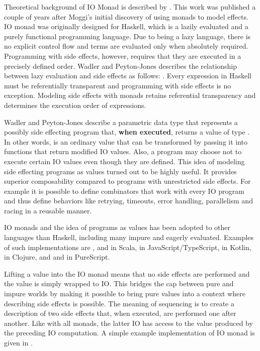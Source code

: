 Theoretical background of IO Monad is described by \textcite{imperative-fp}. This work was published a couple of years after Moggi's initial discovery of using monads to model effects. IO monad was originally designed for Haskell, which is a lazily evaluated and a purely functional programming language. Due to being a lazy language, there is no explicit control flow and terms are evaluated only when absolutely required. Programming with side effects, however, requires that they are executed in a precisely defined order. Wadler and Peyton-Jones describes the relationship between lazy evaluation and side effects as follows: . Every expression in Haskell must be referentially transparent and programming with side effects is no exception. Modeling side effects with monads retains referential transparency and determines the execution order of expressions.

Wadler and Peyton-Jones describe a parametric data type  that represents a possibly side effecting program that, \textbf{when executed}, returns a value of type . In other words,  is an ordinary value that can be transformed by passing it into functions that return modified IO values. Also, a program may choose not to execute certain IO values even though they are defined. This idea of modeling side effecting programs as values turned out to be highly useful. It provides superior composability compared to programs with unrestricted side effects. For example it is possible to define combinators that work with every IO program and thus define behaviors like retrying, timeouts, error handling, parallelism and racing in a reusable manner.

IO monads and the idea of programs as values has been adopted to other languages than Haskell, including many impure and eagerly evaluated. Examples of such implementations are ,  and  in Scala,  in JavaScript/TypeScript,  in Kotlin,  in Clojure, and  and  in PureScript.

Lifting a value into the IO monad means that no side effects are performed and the value is simply wrapped to IO. This bridges the cap between pure and impure worlds by making it possible to bring pure values into a context where describing side effects is possible.
The meaning of sequencing is to create a description of two side effects that, when executed, are performed one after another. Like with all monads, the latter IO has access to the value produced by the preceding IO computation. A simple example implementation of IO monad is given in .

